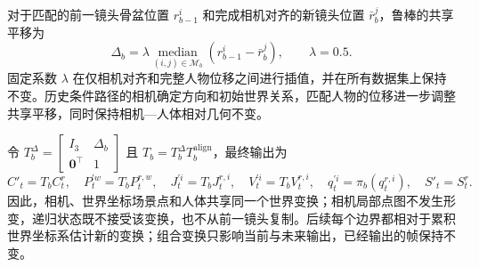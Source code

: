 对于匹配的前一镜头骨盆位置 $r_{b-1}^i$ 和完成相机对齐的新镜头位置 $\bar r_b^j$，鲁棒的共享平移为
\begin{equation}
 \Delta_b=\lambda\underset{(i,j)\in\mathcal M_b}{\operatorname{median}}
 (r_{b-1}^i-\bar r_b^j),\qquad \lambda=0.5.
 \label{eq:shared-translation-zh}
\end{equation}
固定系数 $\lambda$ 在仅相机对齐和完整人物位移之间进行插值，并在所有数据集上保持不变。历史条件路径的相机确定方向和初始世界关系，匹配人物的位移进一步调整共享平移，同时保持相机—人体相对几何不变。

令 $T_b^\Delta=\begin{bmatrix}I_3&\Delta_b\\\mathbf 0^\top&1\end{bmatrix}$ 且 $T_b=T_b^\Delta T_b^{\mathrm{align}}$，最终输出为
\begin{equation}
 C'_t=T_bC_t^r,\quad P_t^{\prime w}=T_bP_t^{r,w},\quad
 J_t^{\prime i}=T_bJ_t^{r,i},\quad V_t^{\prime i}=T_bV_t^{r,i},\quad
 q_t^{\prime i}=\pi_b(q_t^{r,i}),\quad S'_t=S_t^r.
 \label{eq:shared-world-transform-zh}
\end{equation}
因此，相机、世界坐标场景点和人体共享同一个世界变换；相机局部点图不发生形变，递归状态既不接受该变换，也不从前一镜头复制。后续每个边界都相对于累积世界坐标系估计新的变换；组合变换只影响当前与未来输出，已经输出的帧保持不变。
